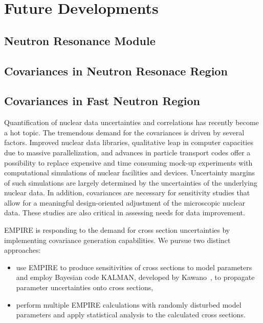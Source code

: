 \section{Future Developments}

\subsection{Neutron Resonance Module}

\subsection{Covariances in Neutron Resonace Region}

\subsection{Covariances in Fast Neutron Region}

Quantification of nuclear data uncertainties and correlations has recently
become a hot topic. The tremendous demand for the covariances is driven by
several factors. Improved nuclear data libraries, qualitative leap in
computer capacities due to massive parallelization, and advances in particle
transport codes offer a possibility to replace expensive and time consuming
mock-up experiments with computational simulations of nuclear facilities and
devices. Uncertainty margins of such simulations are largely determined by
the uncertainties of the underlying nuclear data. In addition, covariances
are necessary for sensitivity studies that allow for a meaningful
design-oriented adjustment of the microscopic nuclear data. These studies
are also critical in assessing needs for data improvement.

EMPIRE is responding to the demand for cross section uncertainties by
implementing covariance generation capabilities. We pursue two distinct
approaches:

\begin{itemize}
\item use EMPIRE to produce sensitivities of cross sections to model
parameters and employ Bayesian code KALMAN, developed by Kawano~\cite%
{Kawano:97}, to propagate parameter uncertainties onto cross sections,

\item perform multiple EMPIRE calculations with randomly disturbed model
parameters and apply statistical analysis to the calculated cross sections.
\end{itemize}

